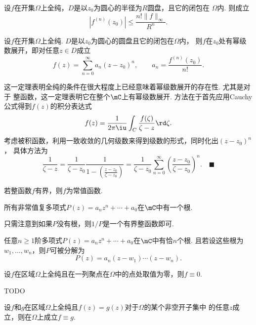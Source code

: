   \begin{cor}
    设$f$在开集$\Omega$上全纯，$D$是以$z_0$为圆心的半径为$R$圆盘，且它的闭包在
    $\Omega$内. 则成立
    \[
      |f^{(n)}(z_0)| \le \frac{n!\|f\|_\infty}{R^n}.
    \]
  \end{cor}

  \begin{thm}[幂级数展开]
    设$f$在开集$\Omega$上全纯. $D$是以$z_0$为圆心的圆盘且它的闭包在$\Omega$内，
    则$f$在$z_0$处有幂级数展开，即对任意$z\in D$成立
    \[
      f(z) = \sum_{n=0}^\infty a_n(z-z_0)^n,\qquad
      a_n = \frac{f^{(n)}(z_0)}{n!}.
    \]
  \end{thm}
  \remark
    这一定理表明全纯的条件在很大程度上已经意味着幂级数展开的存在性. 尤其是对于
    整函数，这一定理表明它在整个$\mC$上有幂级数展开.
  \proof
    方法在于首先应用Cauchy公式得到$f(z)$的积分表达式
    \[
      f(z) = \frac{1}{2\pi\iu}\int_C\frac{f(\zeta)}{\zeta-z}\rd\zeta.
    \]
    考虑被积函数，利用一致收敛的几何级数来得到级数的形式，同时化出$(z-z_0)^n$，
    具体方法为
    \[
      \frac{1}{\zeta-z} = \frac{1}{\zeta-z_0}\frac{1}{1-(\frac{z-z_0}{\zeta-z_0})}
      = \frac{1}{\zeta-z_0}\sum_{n=0}^\infty\left(\frac{z-z_0}{\zeta-z_0}\right)^n.
      \quad\blacksquare
    \]

  \begin{cor}[Liouville]
    \label{cor: Liouville}
    若整函数$f$有界，则$f$为常值函数.
  \end{cor}

  \begin{cor}
    所有非常值复多项式$P(z)=a_nz^n + \cdots + a_0$在$\mC$中有一个根.
  \end{cor}
  \proof
    只需注意到如果$P$没有根，则$1/P$是一个有界整函数即可.

  \begin{cor}
    任意$n\ge 1$阶多项式$P(z)=a_nz^n + \cdots + a_0$在$\mC$中有恰$n$个根.
    且若设这些根为$w_1,\dots,w_n$，则$P$可被分解为
    \[
      P(z) = a_n(z-w_1)\cdots(z-w_n).
    \]
  \end{cor}
  \proof

  \begin{thm}
    设$f$在区域$\Omega$上全纯且在一列聚点在$\Omega$中的点处取值为零，则$f\equiv 0$.
  \end{thm}
  \proof
    TODO

  \begin{cor}
    设$f$和$g$在区域$\Omega$上全纯且$f(z)=g(z)$对于$\Omega$的某个非空开子集中
    的任意$z$成立，则在$\Omega$上成立$f\equiv g$.
  \end{cor}

